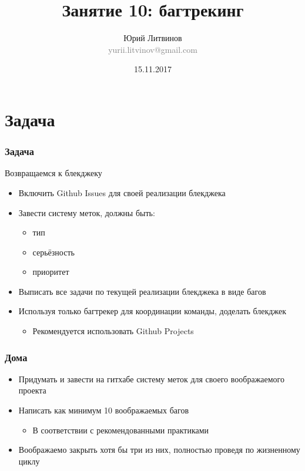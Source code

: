 \documentclass[xetex,mathserif,serif]{beamer}
\title{Занятие 10: багтрекинг}
\author[Юрий Литвинов]{Юрий Литвинов\\\small{\textcolor{gray}{yurii.litvinov@gmail.com}}}
\date{15.11.2017}
\begin{document}
	\frame{\titlepage}

	\section{Задача}

	\begin{frame}
		\frametitle{Задача}
		Возвращаемся к блекджеку
		\begin{itemize}
			\item Включить Github Issues для своей реализации блекджека
			\item Завести систему меток, должны быть:
			\begin{itemize}
				\item тип
				\item серьёзность
				\item приоритет
			\end{itemize}
			\item Выписать все задачи по текущей реализации блекджека в виде багов
			\item Используя только багтрекер для координации команды, доделать блекджек
			\begin{itemize}
				\item Рекомендуется использовать Github Projects
			\end{itemize}
		\end{itemize}
	\end{frame}

	\begin{frame}
		\frametitle{Дома}
		\begin{itemize}
			\item Придумать и завести на гитхабе систему меток для своего воображаемого проекта
			\item Написать как минимум 10 воображаемых багов
			\begin{itemize}
				\item В соответствии с рекомендованными практиками
			\end{itemize}
			\item Воображаемо закрыть хотя бы три из них, полностью проведя по жизненному циклу
		\end{itemize}
	\end{frame}
\end{document}
